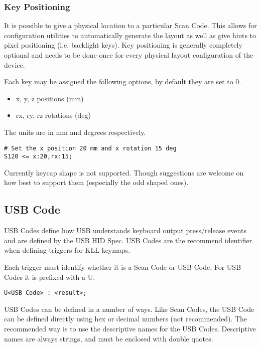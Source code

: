 \documentclass{kiibohd-template}
\begin{document}
\subsubsection{Key Positioning}
\label{subsubsec:keypositioning}

It is possible to give a physical location to a particular Scan Code.
This allows for configuration utilities to automatically generate the layout as well as give hints to pixel positioning (i.e. backlight keys).
Key positioning is generally completely optional and needs to be done once for every physical layout configuration of the device.

Each key may be assigned the following options, by default they are set to 0.

\begin{itemize}
\item x, y, z positions (mm)
\item rx, ry, rz rotations (deg)
\end{itemize}

The units are in mm and degrees respectively.

\begin{lstlisting}
# Set the x position 20 mm and x rotation 15 deg
S120 <= x:20,rx:15;
\end{lstlisting}

Currently keycap shape is not supported.
Though suggestions are welcome on how best to support them (especially the odd shaped ones).


\subsection{USB Code}
\label{subsec:USB_Code}

USB Codes define how USB understands keyboard output press/release events and are defined by the USB HID Spec.
USB Codes are the recommend identifier when defining triggers for KLL keymaps.

Each trigger must identify whether it is a Scan Code or USB Code.
For USB Codes it is prefixed with a U.

\begin{lstlisting}
U<USB Code> : <result>;
\end{lstlisting}

USB Codes can be defined in a number of ways.
Like Scan Codes, the USB Code can be defined directly using hex or decimal numbers (not recommended).
The recommended way is to use the descriptive names for the USB Codes.
Descriptive names are always strings, and must be enclosed with double quotes.
\end{document}
